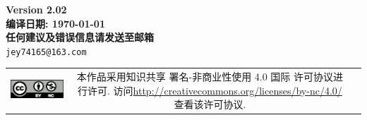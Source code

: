 \documentclass{qbook}
\begin{document}
\pagestyle{empty}
\newpage
\begin{center}
	\Large{\sffamily\bfseries\heiti Version 2.02} \\ \vspace{2em}
	\Large{\sffamily\bfseries\heiti 编译日期: \today} \\ \vspace{1em}
	\Large{\sffamily\bfseries\heiti 任何建议及错误信息请发送至邮箱} \\
	\texttt{jey74165@163.com}
\end{center} 
\vfill
\vspace{30em}
\begin{tabular*}{\textwidth}{ccc}
	\includegraphics{figure/by-nc.eps}
	& \begin{minipage}[b]{0.6\textwidth}
		\small\sffamily
		本作品采用知识共享 署名-非商业性使用 4.0 国际 许可协议进行许可. 访问\url{http://creativecommons.org/licenses/by-nc/4.0/  }查看该许可协议.
	\end{minipage}
\end{tabular*}  
\thispagestyle{empty}
\frontmatter  %
\pagestyle{empty}

\pagestyle{empty}
\tableofcontents
\cleardoublepage
 
\mainmatter	  %
\pagestyle{fancy}
\setcounter{page}{0}
\setcounter{chapter}{-1}










\backmatter	
\printbibliography[heading=bibintoc]
\makeatletter
\makeatother
\end{document}
